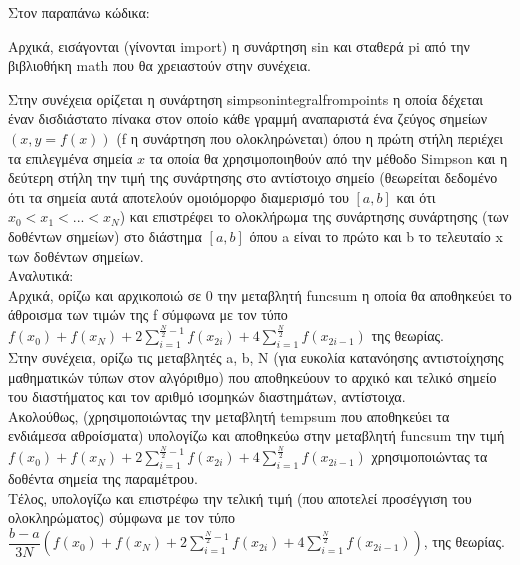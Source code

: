 \documentclass[a4paper,11pt]{article}
\newcommand{\lt}{\latintext}
\newcommand{\gt}{\greektext}
\begin{document}
\lt

\gt

\par
Στον παραπάνω κώδικα:\\
\par
Αρχικά, εισάγονται (γίνονται {\lt import}) η συνάρτηση {\lt sin} και σταθερά {\lt pi} από την βιβλιοθήκη {\lt math} που θα χρειαστούν στην συνέχεια.\\
\par
Στην συνέχεια ορίζεται η συνάρτηση {\lt simpson\textunderscore integral\textunderscore from\textunderscore points} η οποία δέχεται έναν δισδιάστατο πίνακα στον οποίο κάθε γραμμή αναπαριστά ένα ζεύγος σημείων {\lt $(x, y = f(x))$} ({\lt f} η συνάρτηση που ολοκληρώνεται) όπου η πρώτη στήλη περιέχει τα επιλεγμένα σημεία {\lt $x$} τα οποία θα χρησιμοποιηθούν από την μέθοδο {\lt Simpson} και η δεύτερη στήλη την τιμή της συνάρτησης στο αντίστοιχο σημείο (θεωρείται δεδομένο ότι τα σημεία αυτά αποτελούν ομοιόμορφο διαμερισμό του {\lt $[a, b]$} και  ότι $x_0 < x_1 < ... < x_N$) και επιστρέφει το ολοκλήρωμα της συνάρτησης συνάρτησης (των δοθέντων σημείων) στο διάστημα {\lt $[a, b]$} όπου {\lt a} είναι το πρώτο και {\lt b} το τελευταίο {\lt x} των δοθέντων σημείων.\\
Αναλυτικά:\\
Αρχικά, ορίζω και αρχικοποιώ σε 0 την μεταβλητή {\lt func\textunderscore sum} η οποία θα αποθηκεύει το άθροισμα των τιμών της {\lt f} σύμφωνα με τον τύπο {\lt $f(x_0) + f(x_N) + 2\sum_{i=1}^{\frac{N}{2}-1}f(x_{2i}) + 4\sum_{i=1}^{\frac{N}{2}}f(x_{2i-1})$} της θεωρίας.\\
Στην συνέχεια, ορίζω τις μεταβλητές {\lt a, b, N} (για ευκολία κατανόησης αντιστοίχησης μαθηματικών τύπων στον αλγόριθμο) που αποθηκεύουν το αρχικό και τελικό σημείο του διαστήματος και τον αριθμό ισομηκών διαστημάτων, αντίστοιχα.\\
Ακολούθως, (χρησιμοποιώντας την μεταβλητή {\lt temp\textunderscore sum} που αποθηκεύει τα ενδιάμεσα αθροίσματα) υπολογίζω και αποθηκεύω στην μεταβλητή {\lt func\textunderscore sum} την τιμή {\lt $f(x_0) + f(x_N) + 2\sum_{i=1}^{\frac{N}{2}-1}f(x_{2i}) + 4\sum_{i=1}^{\frac{N}{2}}f(x_{2i-1})$} χρησιμοποιώντας τα δοθέντα σημεία της παραμέτρου.\\
Τέλος, υπολογίζω και επιστρέφω την τελική τιμή (που αποτελεί προσέγγιση του ολοκληρώματος) σύμφωνα με τον τύπο {\lt $\dfrac{b-a}{3N}(f(x_0) + f(x_N) + 2\sum_{i=1}^{\frac{N}{2}-1}f(x_{2i}) + 4\sum_{i=1}^{\frac{N}{2}}f(x_{2i-1}))$}, της θεωρίας.\\
\end{document}
